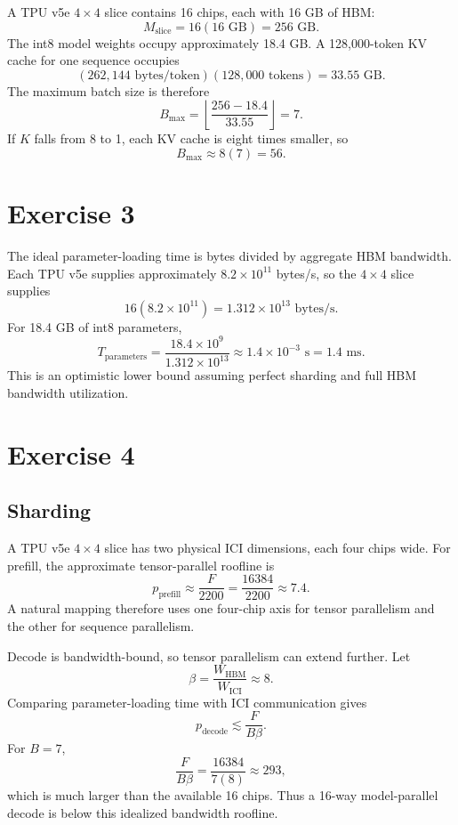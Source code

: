 \documentclass[11pt]{article}
\begin{document}
A TPU v5e $4\times4$ slice contains 16 chips, each with 16 GB of HBM:
\[
M_{\mathrm{slice}}=16(16\text{ GB})=256\text{ GB}.
\]
The int8 model weights occupy approximately 18.4 GB. A 128,000-token KV
cache for one sequence occupies
\[
(262{,}144\text{ bytes/token})(128{,}000\text{ tokens})
=33.55\text{ GB}.
\]
The maximum batch size is therefore
\[
B_{\max}
=\left\lfloor
\frac{256-18.4}{33.55}
\right\rfloor
=\boxed{7}.
\]
If $K$ falls from 8 to 1, each KV cache is eight times smaller, so
\[
\boxed{B_{\max}\approx 8(7)=56}.
\]

\section*{Exercise 3}

The ideal parameter-loading time is bytes divided by aggregate HBM bandwidth.
Each TPU v5e supplies approximately $8.2\times10^{11}$ bytes/s, so the
$4\times4$ slice supplies
\[
16(8.2\times10^{11})=1.312\times10^{13}\text{ bytes/s}.
\]
For 18.4 GB of int8 parameters,
\[
T_{\mathrm{parameters}}
=\frac{18.4\times10^9}{1.312\times10^{13}}
\approx1.4\times10^{-3}\text{ s}
=\boxed{1.4\text{ ms}}.
\]
This is an optimistic lower bound assuming perfect sharding and full HBM
bandwidth utilization.

\section*{Exercise 4}

\subsection*{Sharding}

A TPU v5e $4\times4$ slice has two physical ICI dimensions, each four chips
wide. For prefill, the approximate tensor-parallel roofline is
\[
p_{\mathrm{prefill}}\approx\frac{F}{2200}
=\frac{16384}{2200}\approx7.4.
\]
A natural mapping therefore uses one four-chip axis for tensor parallelism
and the other for sequence parallelism.

Decode is bandwidth-bound, so tensor parallelism can extend further. Let
\[
\beta=\frac{W_{\mathrm{HBM}}}{W_{\mathrm{ICI}}}\approx8.
\]
Comparing parameter-loading time with ICI communication gives
\[
p_{\mathrm{decode}}\lesssim\frac{F}{B\beta}.
\]
For $B=7$,
\[
\frac{F}{B\beta}
=\frac{16384}{7(8)}
\approx293,
\]
which is much larger than the available 16 chips. Thus a 16-way
model-parallel decode is below this idealized bandwidth roofline.
\end{document}
